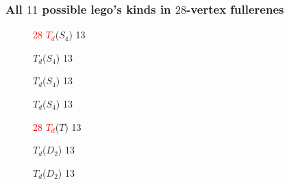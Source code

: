 \documentclass{beamer}
\begin{document}
\begin{frame}\frametitle{All $11$ possible lego's kinds  in  $28$-vertex fullerenes}
\vspace{-1mm}





\begin{figure}
\small\begin{center}
\begin{minipage}[b]{2.1cm}
\centering
{}\par
\textcolor{red}{28 
 $T_d$}($S_4$) 13
\end{minipage}
\begin{minipage}[b]{2.0cm}
\centering
{}\par
 $T_d$($S_4$) 13
\end{minipage}
\begin{minipage}[b]{2.0cm}
\centering
{}\par
 $T_d$($S_4$) 13
\end{minipage}
\begin{minipage}[b]{2.0cm}
\centering
{}\par
$T_d$($S_4$) 13\end{minipage}

\begin{minipage}[b]{2.0cm}
\centering
{}\par
\textcolor{red}{28
 $T_d$}($T$) 13
\end{minipage}
\begin{minipage}[b]{2.0cm}
\centering
{}\par
 $T_d$($D_2$) 13
\end{minipage}
\begin{minipage}[b]{2.0cm}
\centering
\par
 $T_d$($D_2$) 13
\end{minipage}


\end{center}
\end{figure}
\end{frame}
\end{document}
